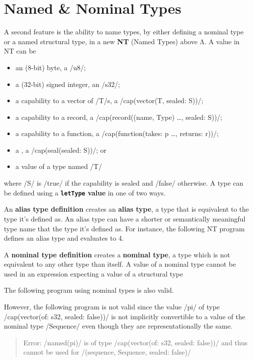 \documentclass[main.tex]{subfiles}
\begin{document}
\section{Named \& Nominal Types} \label{sct:named-ty}
A second feature is the ability to name types, by either defining a nominal type or a named structural type, in a new  \textbf{NT} (Named Types) above Λ. A value in NT can be
\begin{itemize}[nosep]
	\item an (8-bit) byte, a \iil/u8/;
	\item a (32-bit) signed integer, an \iil/s32/;
	\item a capability to a vector of \iil/T/s, a \iil/cap(vector(T, sealed: S))/;
	\item a capability to a record, a \iil/cap(record((name, Type) …, sealed: S))/;
	\item a capability to a function, a \iil/cap(function(takes: p …, returns: r))/;
	\item a , a \iil/cap(seal(sealed: S))/; or
	\item a value of a type named \iil/T/
\end{itemize}
where \iil/S/ is \iil/true/ if the capability is sealed and \iil/false/ otherwise. A type can be defined using a \textbf{\texttt{letType} value} in one of two ways.

An \textbf{alias type definition} creates an \textbf{alias type}, a type that is equivalent to the type it's defined as. An alias type can have a shorter or semantically meaningful type name that the type it's defined as. For instance, the following NT program defines an alias type and evaluates to 4.

A \textbf{nominal type definition} creates a \textbf{nominal type}, a type which is not equivalent to any other type than itself. A value of a nominal type cannot be used in an expression expecting a value of a structural type

The following program using nominal types is also valid.

However, the following program is not valid since the value \iil/pi/ of type \\ \iil/cap(vector(of: s32, sealed: false))/ is not implicitly convertible to a value of the nominal type \iil/Sequence/ even though they are representationally the same.
\begin{quote}
	\ttfamily\footnotesize
	Error: \iil/named(pi)/ is of type \iil/cap(vector(of: s32, sealed: false))/ and thus cannot be used for \iil/(sequence, Sequence, sealed: false)/
\end{quote}
\end{document}
